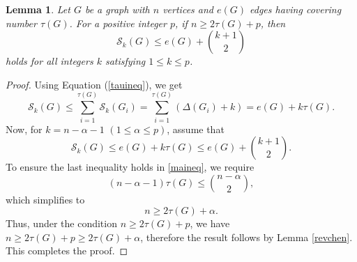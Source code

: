 \documentclass[10pt,a4paper]{amsart}
\newtheorem{lemma}{Lemma}
\begin{document}
\begin{lemma}\label{brotau} Let $G$ be a graph with $n$ vertices and $e(G)$ edges having covering number $\tau(G)$. For a positive integer $p$, if $n\geq 2\tau(G)+p$, then $$\mathcal{S}_k(G)\leq e(G)+\binom{k+1}{2}$$ holds for all integers $k$ satisfying $1\leq k\leq p$.
\end{lemma}

\begin{proof}  

Using Equation (\ref{tauineq}), we get
\begin{equation*}\label{xtauineq}
\mathcal{S}_k(G)\leq \sum_{i=1}^{\tau(G)}\mathcal{S}_k(G_i)=\sum_{i=1}^{\tau(G)} (\Delta(G_i) + k)=e(G)+k\tau(G).
\end{equation*} 
Now, for $k=n-\alpha-1 $ $(1\leq \alpha \leq p)$, assume that
\begin{equation}\label{maineq}
\mathcal{S}_k(G)\leq e(G)+k\tau(G) \leq e(G)+\binom{k+1}{2}.
\end{equation} 
To ensure the last inequality holds in \ref{maineq}, we require
$$(n-\alpha-1)\tau(G)\leq \binom{n-\alpha}{2},$$  
which simplifies to
$$n\geq 2\tau(G)+\alpha.$$  
Thus, under the condition $n\geq 2\tau(G)+p $, we have  $n\geq 2\tau(G)+p\geq 2\tau(G)+\alpha$,  therefore the result follows by Lemma \ref{revchen}. This completes the proof. 	  
\end{proof}
\end{document}
